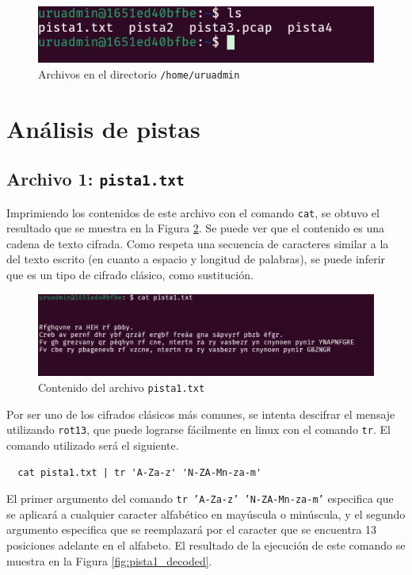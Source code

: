 \documentclass{article}
\begin{document}
\begin{figure}[ht!]
  \includegraphics[width=\textwidth]{ls.png}
  \caption{Archivos en el directorio \texttt{/home/uruadmin}}
  \label{fig:ls}
\end{figure}

\section{Análisis de pistas}

\subsection{Archivo 1: \texttt{pista1.txt}}

Imprimiendo los contenidos de este archivo con el comando \texttt{cat}, se obtuvo el resultado que se muestra en la Figura \ref{fig:pista1}. Se puede ver que el contenido es una cadena de texto cifrada. Como respeta una secuencia de caracteres similar a la del texto escrito (en cuanto a espacio y longitud de palabras), se puede inferir que es un tipo de cifrado clásico, como sustitución.

\begin{figure}[ht!]
  \includegraphics[width=\textwidth]{pista1.png}
  \caption{Contenido del archivo \texttt{pista1.txt}}
  \label{fig:pista1}
\end{figure}

Por ser uno de los cifrados clásicos más comunes, se intenta descifrar el mensaje utilizando \texttt{rot13}, que puede lograrse fácilmente en linux con el comando \texttt{tr}. El comando utilizado será el siguiente.

\begin{verbatim}
  cat pista1.txt | tr 'A-Za-z' 'N-ZA-Mn-za-m'
\end{verbatim}

El primer argumento del comando \texttt{tr 'A-Za-z' 'N-ZA-Mn-za-m'} especifica que se aplicará a cualquier caracter alfabético en mayúscula o minúscula, y el segundo argumento especifica que se reemplazará por el caracter que se encuentra 13 posiciones adelante en el alfabeto. El resultado de la ejecución de este comando se muestra en la Figura \ref{fig:pista1_decoded}.
\end{document}
